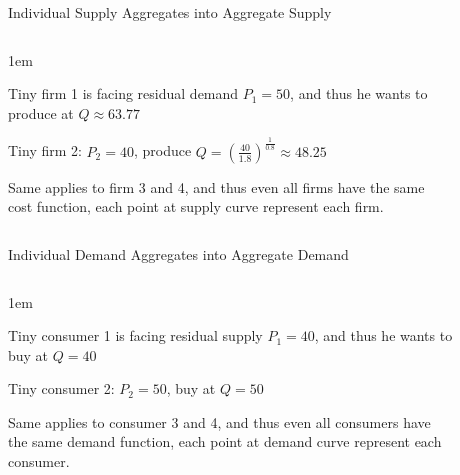 \documentclass[11pt,aspectratio=43,usenames,dvipsnames]{beamer}
\let\olditemize=\itemize
\let\endolditemize=\enditemize
\renewenvironment{itemize}{\olditemize \itemsep1em}{\endolditemize}
\theoremstyle{definition}
\begin{document}
\begin{frame}{Individual Supply Aggregates into Aggregate Supply}
\label{slide:Individual_Supply_Aggregation_into_Aggregate_Supply}
    \begin{columns}
        \begin{column}{0.45\textwidth}
            \begin{itemize}
                \item \alert{Tiny} firm 1 is facing residual demand $ P_{1} = 50 $, and thus he wants to produce at $ Q \approx 63.77 $
                \item \alert{Tiny} firm 2: $ P_{2} = 40$, produce $Q = ( \frac{40}{1.8} )^{ \frac{1}{0.8}} \approx 48.25$
                \item Same applies to firm 3 and 4, and thus even all firms have the same cost function, \alert{each point at supply curve represent each firm}.
            \end{itemize}

        \end{column}
        \begin{column}{0.6\textwidth}
            \begin{figure}
                \centering
                
            \end{figure}
        \end{column}
    \end{columns}

\end{frame}

\begin{frame}{Individual Demand Aggregates into Aggregate Demand}
\label{slide:Individual_Demand_Aggregates_into_Aggregate_Demand}
    \begin{columns}
        \begin{column}{0.45\textwidth}
            \begin{itemize}
                \item \alert{Tiny} \alert{consumer} 1 is facing residual supply $ P_{1} = 40 $, and thus he wants to buy at $ Q = 40$
                \item \alert{Tiny} consumer 2: $ P_{2} = 50$, buy at $Q = 50$
                \item Same applies to consumer 3 and 4, and thus even all consumers have the same demand function, \alert{each point at demand curve represent each consumer}.
            \end{itemize}

        \end{column}
        \begin{column}{0.6\textwidth}
            \begin{figure}
                \centering
                
            \end{figure}
        \end{column}
    \end{columns}

\end{frame}
\end{document}
